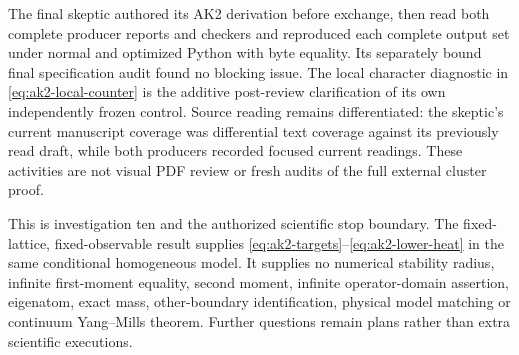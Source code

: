 The final skeptic authored its AK2 derivation before exchange, then read both complete producer reports and checkers and reproduced each complete output set under normal and optimized Python with byte equality. Its separately bound final specification audit found no blocking issue. The local character diagnostic in \eqref{eq:ak2-local-counter} is the additive post-review clarification of its own independently frozen control. Source reading remains differentiated: the skeptic's current manuscript coverage was differential text coverage against its previously read draft, while both producers recorded focused current readings. These activities are not visual PDF review or fresh audits of the full external cluster proof.

This is investigation ten and the authorized scientific stop boundary. The fixed-lattice, fixed-observable result supplies \eqref{eq:ak2-targets}--\eqref{eq:ak2-lower-heat} in the same conditional homogeneous model. It supplies no numerical stability radius, infinite first-moment equality, second moment, infinite operator-domain assertion, eigenatom, exact mass, other-boundary identification, physical model matching or continuum Yang--Mills theorem. Further questions remain plans rather than extra scientific executions.
